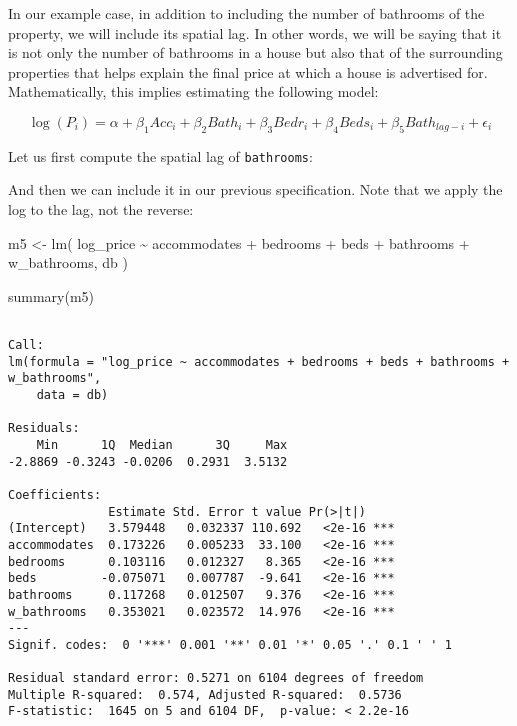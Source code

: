 \documentclass[
  letterpaper,
  krantz2]{style/krantz}
\newenvironment{Shaded}{\begin{snugshade}}{\end{snugshade}}
\newcommand{\FunctionTok}[1]{\textcolor[rgb]{0.28,0.35,0.67}{#1}}
\newcommand{\NormalTok}[1]{\textcolor[rgb]{0.00,0.23,0.31}{#1}}
\newcommand{\OtherTok}[1]{\textcolor[rgb]{0.00,0.23,0.31}{#1}}
\newcommand{\SpecialCharTok}[1]{\textcolor[rgb]{0.37,0.37,0.37}{#1}}
\newcommand{\StringTok}[1]{\textcolor[rgb]{0.13,0.47,0.30}{#1}}
\begin{document}
In our example case, in addition to including the number of bathrooms of
the property, we will include its spatial lag. In other words, we will
be saying that it is not only the number of bathrooms in a house but
also that of the surrounding properties that helps explain the final
price at which a house is advertised for. Mathematically, this implies
estimating the following model:

\[
\log(P_i) = \alpha + \beta_1 Acc_i + \beta_2 Bath_i + \beta_3 Bedr_i + \beta_4 Beds_i+ \beta_5 Bath_{lag-i} + \epsilon_i
\]

Let us first compute the spatial lag of \texttt{bathrooms}:

\begin{Shaded}
\end{Shaded}

And then we can include it in our previous specification. Note that we
apply the log to the lag, not the reverse:

\begin{Shaded}
\begin{Highlighting}[]
\NormalTok{m5 }\OtherTok{\textless{}{-}} \FunctionTok{lm}\NormalTok{(}
  \StringTok{\textquotesingle{}log\_price \textasciitilde{} accommodates + bedrooms + beds + bathrooms + w\_bathrooms\textquotesingle{}}\NormalTok{,}
\NormalTok{  db}
\NormalTok{)}

\FunctionTok{summary}\NormalTok{(m5)}
\end{Highlighting}
\end{Shaded}

\begin{verbatim}

Call:
lm(formula = "log_price ~ accommodates + bedrooms + beds + bathrooms + w_bathrooms", 
    data = db)

Residuals:
    Min      1Q  Median      3Q     Max 
-2.8869 -0.3243 -0.0206  0.2931  3.5132 

Coefficients:
              Estimate Std. Error t value Pr(>|t|)    
(Intercept)   3.579448   0.032337 110.692   <2e-16 ***
accommodates  0.173226   0.005233  33.100   <2e-16 ***
bedrooms      0.103116   0.012327   8.365   <2e-16 ***
beds         -0.075071   0.007787  -9.641   <2e-16 ***
bathrooms     0.117268   0.012507   9.376   <2e-16 ***
w_bathrooms   0.353021   0.023572  14.976   <2e-16 ***
---
Signif. codes:  0 '***' 0.001 '**' 0.01 '*' 0.05 '.' 0.1 ' ' 1

Residual standard error: 0.5271 on 6104 degrees of freedom
Multiple R-squared:  0.574, Adjusted R-squared:  0.5736 
F-statistic:  1645 on 5 and 6104 DF,  p-value: < 2.2e-16
\end{verbatim}
\end{document}
